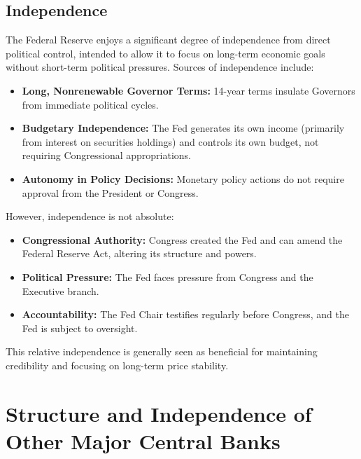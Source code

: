 \subsection{Independence}
The Federal Reserve enjoys a significant degree of independence from direct political control, intended to allow it to focus on long-term economic goals without short-term political pressures. Sources of independence include:
\begin{itemize}
    \item \textbf{Long, Nonrenewable Governor Terms:} 14-year terms insulate Governors from immediate political cycles.
    \item \textbf{Budgetary Independence:} The Fed generates its own income (primarily from interest on securities holdings) and controls its own budget, not requiring Congressional appropriations.
    \item \textbf{Autonomy in Policy Decisions:} Monetary policy actions do not require approval from the President or Congress.
\end{itemize}
However, independence is not absolute:
\begin{itemize}
    \item \textbf{Congressional Authority:} Congress created the Fed and can amend the Federal Reserve Act, altering its structure and powers.
    \item \textbf{Political Pressure:} The Fed faces pressure from Congress and the Executive branch.
    \item \textbf{Accountability:} The Fed Chair testifies regularly before Congress, and the Fed is subject to oversight.
\end{itemize}
This relative independence is generally seen as beneficial for maintaining credibility and focusing on long-term price stability.

\section{Structure and Independence of Other Major Central Banks}

